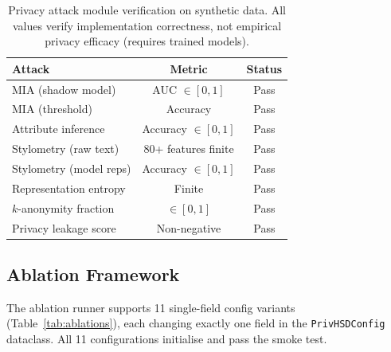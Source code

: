 \documentclass{article}
\begin{document}
\begin{table}[h]
  \centering
  \caption{Privacy attack module verification on synthetic data.
           All values verify implementation correctness, not empirical
           privacy efficacy (requires trained models).}
  \label{tab:attacks}
  \begin{tabular}{lcc}
    \toprule
    \textbf{Attack} & \textbf{Metric} & \textbf{Status} \\
    \midrule
    MIA (shadow model) & AUC $\in [0,1]$ & Pass \\
    MIA (threshold) & Accuracy & Pass \\
    Attribute inference & Accuracy $\in [0,1]$ & Pass \\
    Stylometry (raw text) & 80+ features finite & Pass \\
    Stylometry (model reps) & Accuracy $\in [0,1]$ & Pass \\
    Representation entropy & Finite & Pass \\
    $k$-anonymity fraction & $\in [0,1]$ & Pass \\
    Privacy leakage score & Non-negative & Pass \\
    \bottomrule
  \end{tabular}
\end{table}

\subsection{Ablation Framework}

The ablation runner supports 11 single-field config variants
(Table~\ref{tab:ablations}), each changing exactly one field in the
\texttt{PrivHSDConfig} dataclass.
All 11 configurations initialise and pass the smoke test.

\end{document}
